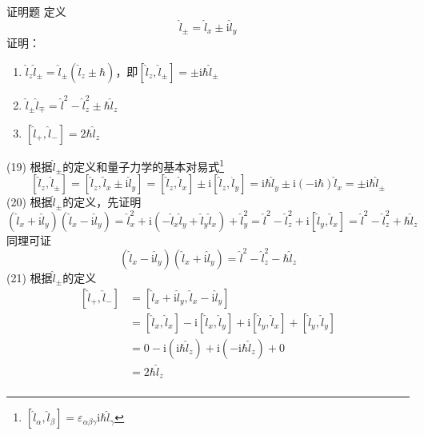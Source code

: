 \begin{question}{证明题}
    定义
    $$
        \hat{l}_{\pm} = \hat{l}_x \pm \mathrm{i}\hat{l}_y
    $$
    证明：
    \begin{enumerate}
        \item[(19)] $\hat{l}_z\hat{l}_{\pm}=\hat{l}_{\pm}\left(\hat{l}_z \pm \hbar\right)$，即$\left[\hat{l}_z, \hat{l}_{\pm}\right]=\pm\mathrm{i}\hbar\hat{l}_{\pm}$
        \item[(20)] $\hat{l}_{\pm}\hat{l}_{\mp}=\hat{l}^2 - \hat{l}_z^2 \pm \hbar\hat{l}_z$
        \item[(21)] $\left[\hat{l}_{+}, \hat{l}_{-}\right]=2\hbar\hat{l}_z$
    \end{enumerate}
\end{question}
\begin{solution}
    (19) 根据$\hat{l}_{\pm}$的定义和量子力学的基本对易式\footnote{$\left[\hat{l}_{\alpha}, \hat{l}_{\beta}\right]=\varepsilon_{\alpha\beta\gamma}\mathrm{i}\hbar\hat{l}_{\gamma}$}
    $$
        \left[\hat{l}_z, \hat{l}_{\pm}\right]
        =\left[\hat{l}_z, \hat{l}_x\pm\mathrm{i}\hat{l}_y\right]
        =\left[\hat{l}_z, \hat{l}_x\right]\pm\mathrm{i}\left[\hat{l}_z, \hat{l}_y\right]
        =\mathrm{i}\hbar\hat{l}_y\pm\mathrm{i}(-\mathrm{i}\hbar)\hat{l}_x
        =\pm\mathrm{i}\hbar\hat{l}_{\pm}
    $$
    (20) 根据$\hat{l}_{\pm}$的定义，先证明
    $$
        \left(\hat{l}_x+\mathrm{i}\hat{l}_y\right)\left(\hat{l}_x-\mathrm{i}\hat{l}_y\right)
        =\hat{l}_x^2+\mathrm{i}\left(-\hat{l}_x\hat{l}_y+\hat{l}_y\hat{l}_x\right)+\hat{l}_y^2
        =\hat{l}^2-\hat{l}_z^2+\mathrm{i}\left[\hat{l}_y, \hat{l}_x\right]
        =\hat{l}^2-\hat{l}_z^2+\hbar\hat{l}_z
    $$
    同理可证
    $$
        \left(\hat{l}_x-\mathrm{i}\hat{l}_y\right)\left(\hat{l}_x+\mathrm{i}\hat{l}_y\right)=\hat{l}^2-\hat{l}_z^2-\hbar\hat{l}_z
    $$
    (21) 根据$\hat{l}_{\pm}$的定义
    $$
        \begin{aligned}
            \left[\hat{l}_{+}, \hat{l}_{-}\right]
             & = [\hat{l}_x+\mathrm{i}\hat{l}_y,\hat{l}_x-\mathrm{i}\hat{l}_y]                                               \\
             & = [\hat{l}_x,\hat{l}_x]-\mathrm{i}[\hat{l}_x,\hat{l}_y]+\mathrm{i}[\hat{l}_y,\hat{l}_x]+[\hat{l}_y,\hat{l}_y] \\
             & = 0-\mathrm{i}(\mathrm{i}\hbar\hat{l}_z)+\mathrm{i}(-\mathrm{i}\hbar\hat{l}_z)+0                              \\
             & = 2\hbar\hat{l}_z                                                                                             \\
        \end{aligned}
    $$
\end{solution}

